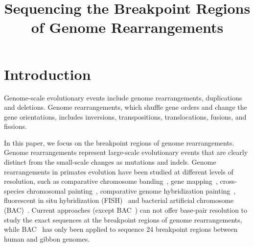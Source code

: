 \documentclass[12pt]{article}
\begin{document}
%

%
\title{Sequencing the Breakpoint Regions of Genome Rearrangements}
%

%
\maketitle              

\section{Introduction}

Genome-scale evolutionary events include genome rearrangements, duplications and deletions. 
Genome rearrangements, which shuffle gene orders and change the gene orientations, 
includes inversions, transpositions, translocations, fusions, and fissions. 

In this paper, we focus on the breakpoint regions of genome rearrangements.
Genome rearrangements represent large-scale evolutionary events that are clearly distinct from the small-scale changes as mutations and indels.
Genome rearrangements in primates evolution have been studied at different levels of resolution, 
such as comparative chromosome banding~\cite{yunis1982origin}, 
gene mapping~\cite{turleau1983gene}, 
cross-species chromosomal painting~\cite{jauch1992reconstruction,murphy2005dynamics}, 
comparative genome hybridization painting~\cite{carbone2006}, fluorescent in situ hybridization (FISH)~\cite{wienberg2005} 
and bacterial artificial chromosome (BAC)~\cite{girirajan2009}. 
Current approaches (except BAC~\cite{girirajan2009}) 
can not offer base-pair resolution to study the exact sequences at the breakpoint regions of genome rearrangements, 
while BAC~\cite{girirajan2009} has only been applied to sequence 24 breakpoint regions between human and gibbon genomes. 
\end{document}

